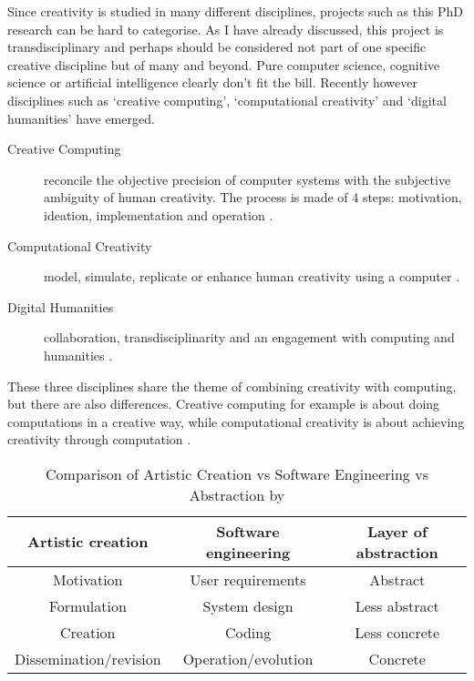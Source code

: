 Since creativity is studied in many different disciplines, projects such as this PhD research can be hard to categorise. As I have already discussed, this project is transdisciplinary and perhaps should be considered not part of one specific creative discipline but of many and beyond. Pure computer science, cognitive science or artificial intelligence clearly don't fit the bill. Recently however disciplines such as `creative computing', `computational creativity' and `digital humanities' have emerged.

\begin{description}
  \item [Creative Computing] reconcile the objective precision of computer systems with the subjective ambiguity of human creativity. The process is made of 4 steps: motivation, ideation, implementation and operation \autocite{Hugill2013c}.
  \item [Computational Creativity] model, simulate, replicate or enhance human creativity using a computer \autocite{Colton2012}.
  \item [Digital Humanities] collaboration, transdisciplinarity and an engagement with computing and humanities \autocite{Burdick2012}.
\end{description}

These three disciplines share the theme of combining creativity with computing, but there are also differences. Creative computing for example is about doing computations in a creative way, while computational creativity is about achieving creativity through computation \autocite{Hugill2013}.

\begin{table}[!htbp]
\centering
\begin{tabu}{ccc}
\toprule
\textbf{Artistic creation} & \textbf{Software engineering} & \textbf{Layer of abstraction} \\
\midrule
Motivation & User requirements & Abstract \\
Formulation & System design & Less abstract \\
Creation & Coding & Less concrete \\
Dissemination/revision & Operation/evolution & Concrete \\
\bottomrule
\end{tabu}
\caption[Artistic Creation vs Software Engineering vs Abstraction]{Comparison of Artistic Creation vs Software Engineering vs Abstraction by \autocite{Hugill2013c}}
\label{tab:acsea}
\end{table}

